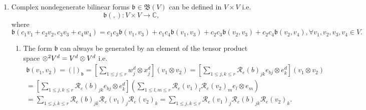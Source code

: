 \documentclass[aps,preprint]{revtex4}%
\begin{document}
\begin{enumerate}
\item Complex nondegenerate bilinear forms $\mathfrak{b}\in\mathfrak{B}\left(
V\right)  $ can be defined in $V\times V$ i.e.
\begin{equation}
\mathfrak{b}\left(  ,\right)  :V\times V\rightarrow\mathbb{C},
\end{equation}
where
\begin{equation}
\mathfrak{b}\left(  c_{1}v_{1}+c_{2}v_{2},c_{3}v_{3}+c_{4}w_{4}\right)
=c_{1}c_{3}\mathfrak{b}\left(  v_{1},v_{3}\right)  +c_{1}c_{4}\mathfrak{b}%
\left(  v_{1},v_{3}\right)  +c_{2}c_{3}\mathfrak{b}\left(  v_{2},v_{3}\right)
+c_{2}c_{4}\mathfrak{b}\left(  v_{2},v_{4}\right)  ,\forall v_{1},v_{2}%
,v_{3},v_{4}\in V.
\end{equation}


\begin{enumerate}
\item The form $\mathfrak{b}$ can always be generated by an element of the
tensor product space ${\large \otimes}^{2}V^{d}=V^{d}\otimes V^{d}$ i.e.
\begin{gather}
\mathfrak{b}\left(  v_{1},v_{2}\right)  =\left(  \left.  {}\right\vert \left.
{}\right.  \right)  _{\mathfrak{b}}=\left[  \sum_{1\leq j\leq r}w_{j}%
^{d}\otimes x_{j}^{d}\right]  \left(  v_{1}\otimes v_{2}\right)  =\left[
\sum_{1\leq j,k\leq r}\mathcal{R}_{e}\left(  b\right)  _{jk}e_{bj}\otimes
e_{k}^{d}\right]  \left(  v_{1}\otimes v_{2}\right) \\
=\left[  \sum_{1\leq j,k\leq r}\mathcal{R}_{e}\left(  b\right)  _{jk}%
e_{bj}\otimes e_{k}^{d}\right]  \left(  \sum_{1\leq l,m\leq r}\mathcal{R}%
_{e}\left(  v_{1}\right)  _{l}\mathcal{R}_{e}\left(  v_{2}\right)  _{m}%
e_{l}\otimes e_{m}\right) \\
=\sum_{1\leq j,k\leq r}\mathcal{R}_{e}\left(  b\right)  _{jk}\mathcal{R}%
_{e}\left(  v_{1}\right)  _{j}\mathcal{R}_{e}\left(  v_{2}\right)  _{k}%
=\sum_{1\leq j,k\leq r}\mathcal{R}_{e}\left(  v_{1}\right)  _{j}%
\mathcal{R}_{e}\left(  b\right)  _{jk}\mathcal{R}_{e}\left(  v_{2}\right)
_{k}.
\end{gather}



\end{enumerate}
\end{enumerate}
\end{document}
